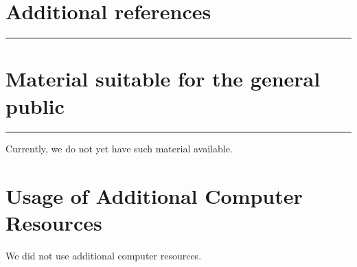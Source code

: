 \documentclass [a4paper, 11pt]{article}
\begin{document}
\section{Additional references}
\rule{\textwidth}{0.4pt}



\section{Material suitable for the general public}
\rule{\textwidth}{0.4pt}

Currently, we do not yet have such material available.

\section{Usage of Additional Computer Resources}

We did not use additional computer resources.


\end{document}
